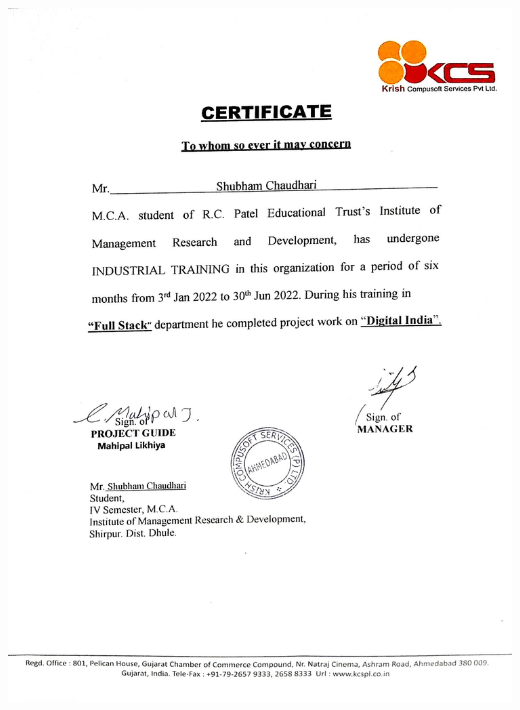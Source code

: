 \thispagestyle{empty}
\begin{center}



\end{center}
\begin{flushleft}
\justifying
\begin{spacing}{2}

\begin{center}
\includegraphics[height=20cm,width=14cm]{comp_Certi/Comp_certi.jpg}
\end{center}





\end{spacing}
\noindent

\end{flushleft}
